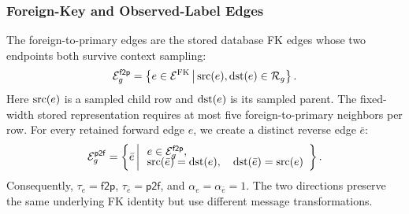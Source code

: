\subsubsection{Foreign-Key and Observed-Label Edges}
\label{sec:method:row-graph-edges}

The foreign-to-primary edges are the stored database FK edges whose two
endpoints both survive context sampling:
\begin{equation}
  \mathcal E_g^{\mathsf{f2p}}
  =
  \left\{
    e\in\mathcal E^{\mathrm{FK}}
    \,\middle|\,
    \operatorname{src}(e),\operatorname{dst}(e)\in\mathcal R_g
  \right\}.
\label{eq:method:f2p-edges}
\end{equation}
Here \(\operatorname{src}(e)\) is a sampled child row and \(\operatorname{dst}(e)\) is its sampled
parent. The fixed-width stored representation requires at most five
foreign-to-primary neighbors per row. For every retained forward edge
\(e\), we create a distinct reverse edge \(\bar e\):
\begin{equation}
  \mathcal E_g^{\mathsf{p2f}}
  =
  \left\{
    \bar e
    \,\middle|\,
    \begin{array}{l}
      e\in\mathcal E_g^{\mathsf{f2p}},\\[-1mm]
      \operatorname{src}(\bar e)=\operatorname{dst}(e),\quad
      \operatorname{dst}(\bar e)=\operatorname{src}(e)
    \end{array}
  \right\}.
\label{eq:method:p2f-edges}
\end{equation}
Consequently, \(\tau_e=\mathsf{f2p}\),
\(\tau_{\bar e}=\mathsf{p2f}\), and
\(\alpha_e=\alpha_{\bar e}=1\). The two directions preserve the same
underlying FK identity but use different message transformations.

